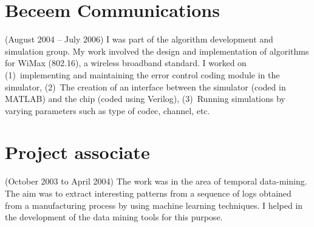 \documentclass[10pt]{article} %
\begin{document}
\begin{resume}
{\section{\textnormal{Beceem Communications}}\label{sec:beceem}
(August 2004 -- July 2006)
I was part of the algorithm development and simulation group. My
work involved the design and implementation of algorithms for WiMax
(802.16), a wireless broadband standard. I worked on (1)~implementing
and maintaining the error control coding module in the simulator, 
(2)~The creation of an interface between
the simulator (coded in MATLAB) and the chip (coded using Verilog), 
(3)~Running simulations by
varying parameters such as type of codec, channel, etc.
\section{\textnormal{Project associate}}\label{sec:dataMining}
(October 2003 to April 2004)
The work was in the area of temporal data-mining. 
The aim was to extract interesting patterns from a sequence of logs
obtained from a manufacturing process by using machine learning techniques.
I helped in the development of the data mining tools for this purpose.
%
}
\end{resume}
\end{document}
